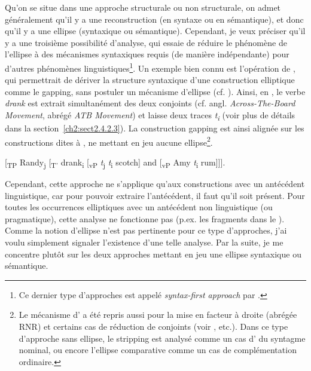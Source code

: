Qu’on se situe dans une approche structurale ou non structurale, on admet généralement qu’il y a une reconstruction (en syntaxe ou en sémantique), et donc qu’il y a une ellipse (syntaxique ou sémantique). Cependant, je veux préciser qu’il y a une troisième possibilité d’analyse, qui essaie de réduire le phénomène de l’ellipse à des mécanismes syntaxiques requis (de manière indépendante) pour d’autres phénomènes linguistiques\footnote{Ce dernier type d’approches est appelé \textit{syntax-first approach} par \citet{SchwabeEtAl2003}.}. Un exemple bien connu est l’opération de , qui permettrait de dériver la structure syntaxique d’une construction elliptique comme le gapping, sans postuler un mécanisme d’ellipse (cf. \citealt{Johnson1996/2004,Johnson2000,Johnson2009,ZoernerEtAl2000,LopezEtAl2003,Winkler2005}). Ainsi, en , le verbe \textit{drank} est extrait simultanément des deux conjoints (cf. angl. \textit{Across-The-Board Movement}, abrégé \textit{ATB Movement}) et laisse deux traces \textit{t}\textit{\textsubscript{i}} (voir plus de détails dans la section~\ref{ch2:sect2.4.2.3}). La construction gapping est ainsi alignée sur les constructions dites à , ne mettant en jeu aucune ellipse\footnote{Le mécanisme d’ a été repris aussi pour la mise en facteur à droite (abrégée RNR) et certains cas de réduction de conjoints (voir \citealt{Ross1967,Hudson1976,Maling1972,Sabbagh2007}, etc.). Dans ce type d’approche sans ellipse, le stripping est analysé comme un cas d’ du syntagme nominal, ou encore l’ellipse comparative comme un cas de complémentation ordinaire.}.

\ea {} 
[\textsubscript{TP} Randy\textsubscript{j} [\textsubscript{T’} drank\textsubscript{i} [\textsubscript{vP} \textit{t}\textsubscript{j}\textit{ t}\textsubscript{i} scotch] and [\textsubscript{vP} Amy \textit{t}\textsubscript{i} rum]]]. \citep{Johnson2009} \label{ch1:ex106} 
\z

Cependant, cette approche ne s’applique qu’aux constructions avec un antécédent linguistique, car pour pouvoir extraire l’antécédent, il faut qu’il soit présent. Pour toutes les occurrences elliptiques avec un antécédent non linguistique (ou pragmatique), cette analyse ne fonctionne pas (p.ex. les fragments dans le ). Comme la notion d’ellipse n’est pas pertinente pour ce type d’approches, j’ai voulu simplement signaler l’existence d’une telle analyse. Par la suite, je me concentre plutôt sur les deux approches mettant en jeu une ellipse syntaxique ou sémantique. 


